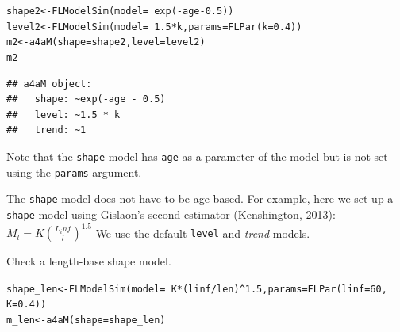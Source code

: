 \documentclass[a4paper,english,10pt]{article}\usepackage[]{graphicx}\usepackage[]{color}
\makeatletter
\newcommand{\hlnum}[1]{\textcolor[rgb]{0.2,0.2,0.2}{#1}}%
\newcommand{\hlopt}[1]{\textcolor[rgb]{0.2,0.2,0.2}{#1}}%
\newcommand{\hlstd}[1]{\textcolor[rgb]{0,0,0}{#1}}%
\newcommand{\hlkwb}[1]{\textcolor[rgb]{0.361,0.506,0.596}{#1}}%
\newcommand{\hlkwc}[1]{\textcolor[rgb]{0.361,0.506,0.596}{#1}}%
\newcommand{\hlkwd}[1]{\textcolor[rgb]{0.361,0.506,0.596}{#1}}%
\newenvironment{kframe}{%
 \def\at@end@of@kframe{}%
 \ifinner\ifhmode%
  \def\at@end@of@kframe{\end{minipage}}%
  \begin{minipage}{\columnwidth}%
 \fi\fi%
 \def\FrameCommand##1{\hskip\@totalleftmargin \hskip-\fboxsep
 \colorbox{shadecolor}{##1}\hskip-\fboxsep
     \hskip-\linewidth \hskip-\@totalleftmargin \hskip\columnwidth}%
 \MakeFramed {\advance\hsize-\width
   \@totalleftmargin\z@ \linewidth\hsize
   \@setminipage}}%
 {\par\unskip\endMakeFramed%
 \at@end@of@kframe}
\newenvironment{knitrout}{}{} %
\newcommand{\code}[1]{{\texttt{#1}}}
\newcommand{\class}[1]{{\textit{#1}}}
\makeatother
\begin{document}
\begin{knitrout}
\color{fgcolor}\begin{kframe}
\begin{alltt}
\hlstd{shape2} \hlkwb{<-} \hlkwd{FLModelSim}\hlstd{(}\hlkwc{model} \hlstd{=} \hlopt{~}\hlkwd{exp}\hlstd{(}\hlopt{-}\hlstd{age} \hlopt{-} \hlnum{0.5}\hlstd{))}
\hlstd{level2} \hlkwb{<-} \hlkwd{FLModelSim}\hlstd{(}\hlkwc{model} \hlstd{=} \hlopt{~}\hlnum{1.5} \hlopt{*} \hlstd{k,} \hlkwc{params} \hlstd{=} \hlkwd{FLPar}\hlstd{(}\hlkwc{k} \hlstd{=} \hlnum{0.4}\hlstd{))}
\hlstd{m2} \hlkwb{<-} \hlkwd{a4aM}\hlstd{(}\hlkwc{shape} \hlstd{= shape2,} \hlkwc{level} \hlstd{= level2)}
\hlstd{m2}
\end{alltt}
\begin{verbatim}
## a4aM object:
##   shape: ~exp(-age - 0.5)
##   level: ~1.5 * k
##   trend: ~1
\end{verbatim}
\end{kframe}
\end{knitrout}


Note that the \code{shape} model has \code{age} as a parameter of the model but is not set using the \code{params} argument.

The \code{shape} model does not have to be age-based. For example, here we set up a \code{shape} model using Gislaon's second estimator (Kenshington, 2013):
$M_l=K(\frac{L_inf}{l})^1.5$
We use the default \code{level} and \class{trend} models.

Check a length-base shape model.

\begin{knitrout}
\color{fgcolor}\begin{kframe}
\begin{alltt}
\hlstd{shape_len} \hlkwb{<-} \hlkwd{FLModelSim}\hlstd{(}\hlkwc{model} \hlstd{=} \hlopt{~}\hlstd{K} \hlopt{*} \hlstd{(linf}\hlopt{/}\hlstd{len)}\hlopt{^}\hlnum{1.5}\hlstd{,} \hlkwc{params} \hlstd{=} \hlkwd{FLPar}\hlstd{(}\hlkwc{linf} \hlstd{=} \hlnum{60}\hlstd{,}
    \hlkwc{K} \hlstd{=} \hlnum{0.4}\hlstd{))}
\hlstd{m_len} \hlkwb{<-} \hlkwd{a4aM}\hlstd{(}\hlkwc{shape} \hlstd{= shape_len)}
\end{alltt}
\end{kframe}
\end{knitrout}
\end{document}
